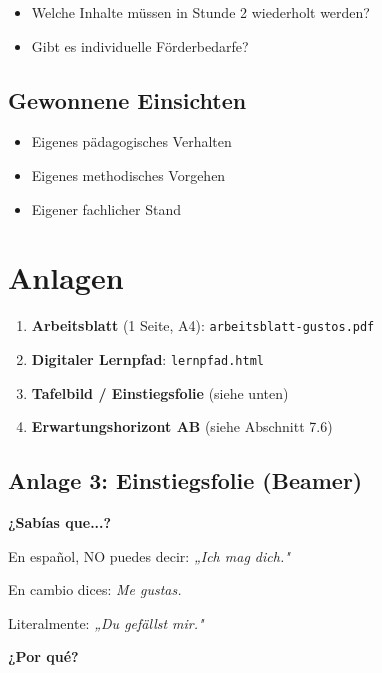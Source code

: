 \documentclass[11pt, a4paper]{article}
\newcommand{\es}[1]{\textcolor{spanisch}{\textit{#1}}}
\begin{document}
\begin{itemize}[leftmargin=2em]
    \item Welche Inhalte müssen in Stunde 2 wiederholt werden?
    \item Gibt es individuelle Förderbedarfe?
\end{itemize}

\subsection{Gewonnene Einsichten}

\begin{itemize}[leftmargin=2em]
    \item Eigenes pädagogisches Verhalten
    \item Eigenes methodisches Vorgehen
    \item Eigener fachlicher Stand
\end{itemize}


\section{Anlagen}

\begin{enumerate}[leftmargin=2em]
    \item \textbf{Arbeitsblatt} (1 Seite, A4): \texttt{arbeitsblatt-gustos.pdf}
    \item \textbf{Digitaler Lernpfad}: \texttt{lernpfad.html}
    \item \textbf{Tafelbild / Einstiegsfolie} (siehe unten)
    \item \textbf{Erwartungshorizont AB} (siehe Abschnitt 7.6)
\end{enumerate}

\subsection*{Anlage 3: Einstiegsfolie (Beamer)}

\begin{infobox}
    \begin{center}
        {\large\bfseries ¿Sabías que...?}

        \vspace{0.5cm}

        En español, NO puedes decir: \textit{„Ich mag dich."}

        \vspace{0.3cm}

        En cambio dices: \es{Me gustas.}

        \vspace{0.3cm}

        Literalmente: \textit{„Du gefällst mir."}

        \vspace{0.5cm}

        {\normalsize\bfseries ¿Por qué?}
    \end{center}
\end{infobox}
\end{document}
